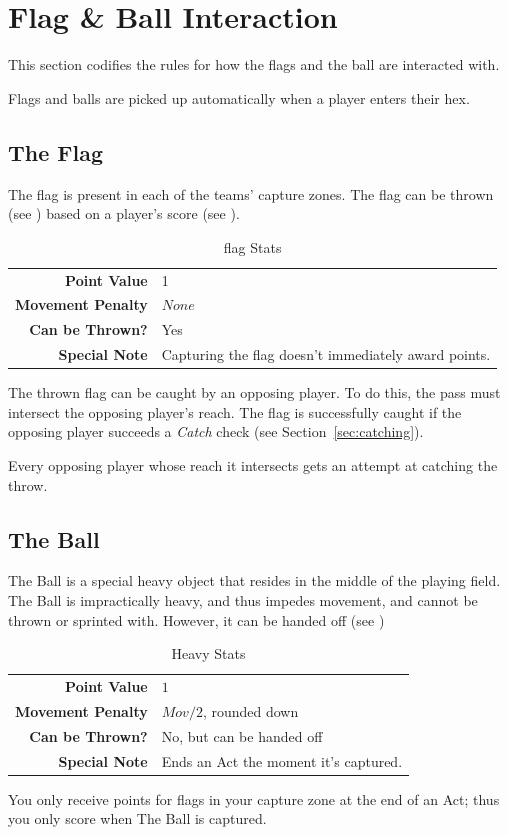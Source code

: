 \section{Flag \& Ball Interaction} \label{flag-interaction}
This section codifies the rules for how the flags and the ball are interacted with.

Flags and balls are picked up automatically when a player enters their hex.

\subsection{The Flag}
The flag is present in each of the teams' capture zones.
The flag can be thrown (see ) based on a player's \throw{} score (see ).

\begin{table}[!ht]
    \centering
\begin{tabular}{r|l}
    \textbf{Point Value} & 1 \\
    \textbf{Movement Penalty} & $None$ \\
    \textbf{Can be Thrown?} & Yes \\
    \textbf{Special Note} & Capturing the flag doesn't immediately award points. \\
\end{tabular} 
    \caption{flag Stats}
    \label{tab:flag}
\end{table}
The thrown flag can be caught by an opposing player.
To do this, the pass must intersect the opposing player's reach.
The flag is successfully caught if the opposing player succeeds a \textit{Catch} check (see Section~\ref{sec:catching}).

Every opposing player whose reach it intersects gets an attempt at catching the throw.

\subsection{The Ball}
The Ball is a special heavy object that resides in the middle of the playing field.
The Ball is impractically heavy, and thus impedes movement, and cannot be thrown or sprinted with.
However, it can be handed off (see )

\begin{table}[!ht]
    \centering
\begin{tabular}{r|l}
    \textbf{Point Value} & $1$ \\
    \textbf{Movement Penalty} & $Mov/2$, rounded down \\
    \textbf{Can be Thrown?} & No, but can be handed off \\
    \textbf{Special Note} & Ends an Act the moment it's captured.\\
\end{tabular}
    \caption{Heavy Stats}
    \label{tab:heavy}
\end{table}
You only receive points for flags in your capture zone at the end of an Act; thus you only score when The Ball is captured.

